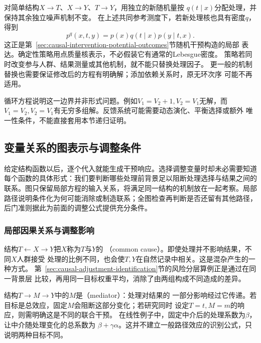 对简单结构\(X\to T\)、\(X\to Y\)、\(T\to Y\)，用独立的新随机量按
\(q(t\mid x)\)分配处理，并保持其余独立噪声机制不变。
在上述共同参考测度下，若新处理核也具有密度\(q\)，得到
\begin{equation}
  p^q(x,t,y)=p(x)q(t\mid x)p(y\mid t,x).
  \label{eq:causal-stochastic-intervention}
\end{equation}
这正是第~\ref{sec:causal-intervention-potential-outcomes}节随机干预构造的局部
表达。确定性策略用点质量核表示，不必假装它有通常的Lebesgue密度。
策略若同时改变参与人群、结果测量或其他机制，就不能只替换处理因子。
更一般的机制替换也需要保证修改后的方程有明确解；添加依赖关系时，原无环次序
可能不再适用。

循环方程说明这一边界并非形式问题。例如\(V_1=V_2+1,V_2=V_1\)无解，而
\(V_1=V_2,V_2=V_1\)有无穷多组解。反馈系统可能需要动态演化、平衡选择或额外
唯一性条件，不能直接套用本节递归证明。

\subsection{变量关系的图表示与调整条件}
\label{sec:causal-graph-adjustment}

给定结构函数以后，逐个代入就能生成干预响应。选择调整变量时却未必需要知道每个函数的具体形式：我们要判断哪些处理前背景足以阻断处理选择与结果之间的联系。图只保留局部方程的输入关系，将满足同一结构的机制放在一起考察。局部路径说明条件化为何可能消除或制造联系；全图检查再判断是否还留有其他路径，后门准则据此为前面的调整公式提供充分条件。

\subsubsection{局部因果关系与调整影响}
\label{sec:causal-local-path-patterns}

结构\(T\leftarrow X\to Y\)把\(X\)称为\(T\)与\(Y\)的
（common cause）。即使处理并不影响结果，不同\(X\)人群接受
处理的比例不同，也会使\(T,Y\)在自然记录中相关。这是混杂产生的一种方式。
第~\ref{sec:causal-adjustment-identification}节的风险分层算例正是通过在同一背景层
比较，再用同一目标权重平均，消除了由两组构成不同造成的差异。

结构\(T\to M\to Y\)中的\(M\)是（mediator）：处理对结果的
一部分影响经过它传递。若目标是总效应，固定\(M\)会阻断这部分变化；若研究同时
设定\(T=t,M=m\)的响应，则需明确这是不同的联合干预。
在线性例子中，固定中介后的处理系数为\(\beta\)，让中介随处理变化的总系数为
\(\beta+\gamma\alpha\)。这并不建立一般路径效应的识别公式，只说明两种目标不同。

